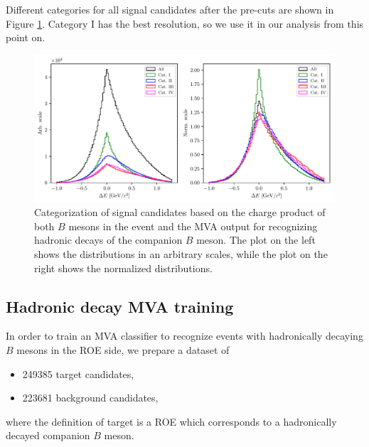 \documentclass[oneside,a4paper,openany,12pt]{scrbook}
\begin{document}
Different categories for all signal candidates after the pre-cuts are shown in Figure \ref{fig:sig_categ}. Category I has the best resolution, so we use it in our analysis from this point on.

\begin{figure}[H]
\centering
\captionsetup{width=0.8\linewidth}
\includegraphics[width=\linewidth]{fig/sig_categ}
\caption{Categorization of signal candidates based on the charge product of both $B$ mesons in the event and the MVA output for recognizing hadronic decays of the companion $B$ meson. The plot on the left shows the distributions in an arbitrary scales, while the plot on the right shows the normalized distributions.}
\label{fig:sig_categ}
\end{figure}


\subsection{Hadronic decay MVA training}
\label{subs:HDMVA}

In order to train an MVA classifier to recognize events with hadronically decaying $B$ mesons in the ROE side, we prepare a dataset of
\begin{itemize}
\item 249385 target candidates,
\item 223681 background candidates,
\end{itemize}
where the definition of target is a ROE which corresponds to a hadronically decayed companion $B$ meson. 
\end{document}

